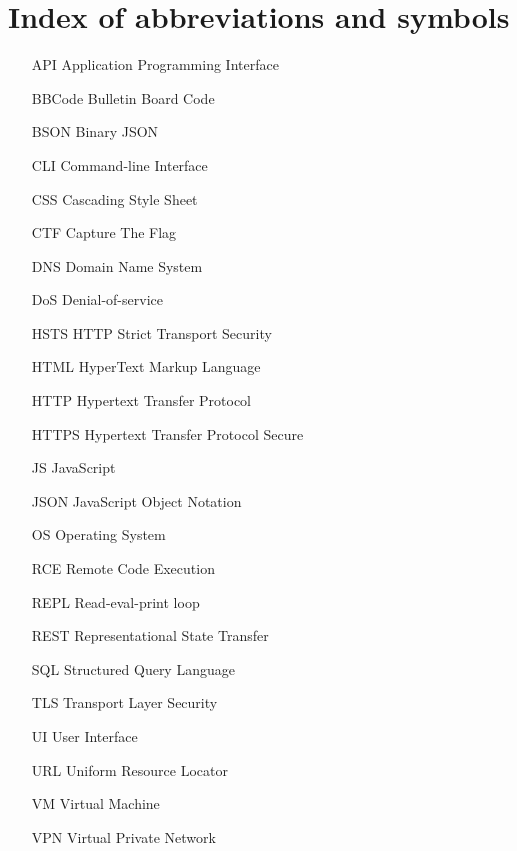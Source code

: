 \chapter{Index of abbreviations and symbols}

\begin{itemize}
	\item[API] Application Programming Interface
	\item[BBCode] Bulletin Board Code
	\item[BSON] Binary JSON
	\item[CLI] Command-line Interface
	\item[CSS] Cascading Style Sheet
	\item[CTF] Capture The Flag
	\item[DNS] Domain Name System
	\item[DoS] Denial-of-service
	\item[HSTS] HTTP Strict Transport Security
	\item[HTML] HyperText Markup Language
	\item[HTTP] Hypertext Transfer Protocol
	\item[HTTPS] Hypertext Transfer Protocol Secure
	\item[JS] JavaScript
	\item[JSON] JavaScript Object Notation
	\item[OS] Operating System
	\item[RCE] Remote Code Execution
	\item[REPL] Read-eval-print loop
	\item[REST] Representational State Transfer
	\item[SQL] Structured Query Language
	\item[TLS] Transport Layer Security
	\item[UI] User Interface
	\item[URL] Uniform Resource Locator
	\item[VM] Virtual Machine
	\item[VPN] Virtual Private Network
\end{itemize}
